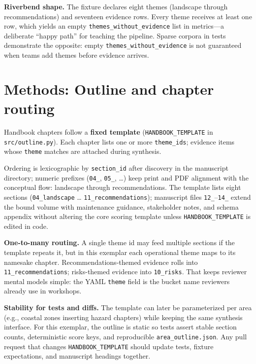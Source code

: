 \documentclass[
]{article}
\begin{document}
\textbf{Riverbend shape.} The fixture declares eight themes (landscape
through recommendations) and seventeen evidence rows. Every theme
receives at least one row, which yields an empty
\texttt{themes\_without\_evidence} list in metrics---a deliberate
``happy path'' for teaching the pipeline. Sparse corpora in tests
demonstrate the opposite: empty \texttt{themes\_without\_evidence} is
not guaranteed when teams add themes before evidence arrives.

\newpage

\section{Methods: Outline and chapter
routing}\label{methods-outline-and-chapter-routing}

Handbook chapters follow a \textbf{fixed template}
(\texttt{HANDBOOK\_TEMPLATE} in \texttt{src/outline.py}). Each chapter
lists one or more \texttt{theme\_ids}; evidence items whose
\texttt{theme} matches are attached during synthesis.

Ordering is lexicographic by \texttt{section\_id} after discovery in the
manuscript directory; numeric prefixes (\texttt{04\_}, \texttt{05\_},
\ldots) keep print and PDF alignment with the conceptual flow: landscape
through recommendations. The template lists eight sections
(\texttt{04\_landscape} \ldots{} \texttt{11\_recommendations});
manuscript files \texttt{12\_}--\texttt{14\_} extend the bound volume
with maintenance guidance, stakeholder notes, and schema appendix
without altering the core scoring template unless
\texttt{HANDBOOK\_TEMPLATE} is edited in code.

\textbf{One-to-many routing.} A single theme id may feed multiple
sections if the template repeats it, but in this exemplar each
operational theme maps to its namesake chapter. Recommendations-themed
evidence rolls into \texttt{11\_recommendations}; risks-themed evidence
into \texttt{10\_risks}. That keeps reviewer mental models simple: the
YAML \texttt{theme} field is the bucket name reviewers already use in
workshops.

\textbf{Stability for tests and diffs.} The template can later be
parameterized per area (e.g., coastal zones inserting hazard chapters)
while keeping the same synthesis interface. For this exemplar, the
outline is static so tests assert stable section counts, deterministic
score keys, and reproducible \texttt{area\_outline.json}. Any pull
request that changes \texttt{HANDBOOK\_TEMPLATE} should update tests,
fixture expectations, and manuscript headings together.
\end{document}

